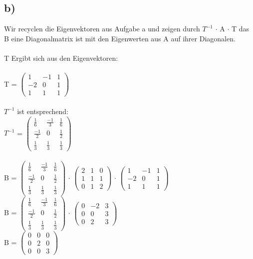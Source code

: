 \documentclass{article}
\begin{document}
	\subsection*{b)}
	Wir recyclen die Eigenvektoren aus Aufgabe a und zeigen durch $T^{-1}$ $\cdot$ A $\cdot$ T das B eine Diagonalmatrix ist mit den Eigenwerten aus A auf ihrer Diagonalen. \\ \\
	T Ergibt sich aus den Eigenvektoren: \\ \\
	T = 
	$\left(
	\begin{array}{ccc}
	 1& -1&1\\ -2&0&1\\ 1&1&1
	\end{array}
	\right)$ \\ \\
	$T^{-1}$ ist entsprechend: \\
	$T^{-1}$ = 
	$
	\left(\begin{array}{ccc}
	\frac{1}{6} & \frac{-1}{3} & \frac{1}{6} \\
	\frac{-1}{2} & 0 & \frac{1}{2} \\
	\frac{1}{3} & \frac{1}{3} & \frac{1}{3}
	\end{array}\right)
	$ \\ \\
	B = 
	$
	\left(\begin{array}{ccc}
	\frac{1}{6} & \frac{-1}{3} & \frac{1}{6} \\
	\frac{-1}{2} & 0 & \frac{1}{2} \\
	\frac{1}{3} & \frac{1}{3} & \frac{1}{3}
	\end{array}\right)
	$
	$\cdot$
	$
	\left(\begin{array}{ccc}
	2 & 1 & 0 \\
	1 & 1 & 1 \\
	0 & 1 & 2
	\end{array}\right)
	$
	$\cdot$
	$
	\left(\begin{array}{ccc}
	1 & -1 & 1 \\
	-2 & 0 & 1 \\
	1 & 1 & 1
	\end{array}\right)
	$ \\
	B = 
	$
	\left(\begin{array}{ccc}
	\frac{1}{6} & \frac{-1}{3} & \frac{1}{6} \\
	\frac{-1}{2} & 0 & \frac{1}{2} \\
	\frac{1}{3} & \frac{1}{3} & \frac{1}{3}
	\end{array}\right)
	$
	$\cdot$
	$
	\left(\begin{array}{ccc}
	0 & -2 & 3 \\
	0 & 0 & 3 \\
	0 & 2 & 3
	\end{array}\right)
	$ \\
	B = 
	$
	\left(\begin{array}{ccc}
	0 & 0 & 0 \\
	0 & 2 & 0 \\
	0 & 0 & 3
	\end{array}\right)
	$
\end{document}
